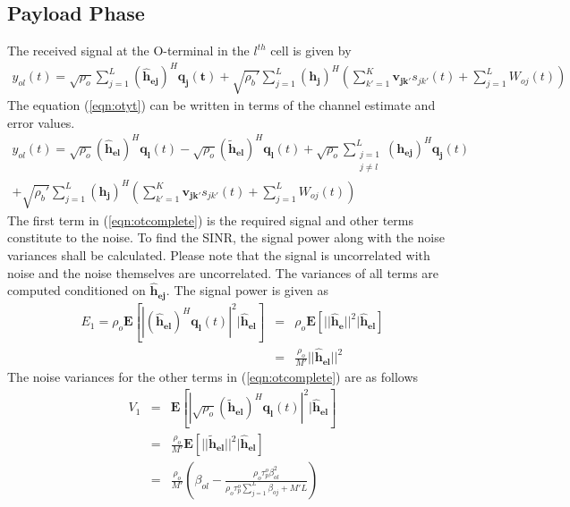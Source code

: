\documentclass[10pt, a4paper, twoside,fleqn]{article}
\begin{document}
\subsection{Payload Phase}

The received signal at the O-terminal in the $l^{th}$ cell is given by
\begin{eqnarray}\label{eqn:otyt}
 y_{ol}(t) = \sqrt{\rho_o} \sum_{j=1}^{L} (\mathbf{\hat h_{ej}})^H \mathbf{q_j(t)}
            + \sqrt{\rho_b'} \sum_{j=1}^{L} (\mathbf{h_j})^H \left(\sum_{k'=1}^{K} \mathbf{v_{jk'}} s_{jk'}(t) + \sum_{j=1}^{L}W_{oj}(t)  \right)
\end{eqnarray} 
The equation (\ref{eqn:otyt}) can be written in terms of the channel estimate and error values.
\begin{eqnarray}\label{eqn:otcomplete}
  y_{ol}(t)= \sqrt{\rho_o} (\mathbf{\hat h_{el}})^H \mathbf{q_l}(t) 
	    - \sqrt{\rho_o}(\mathbf{\widetilde{h}_{el}})^H\mathbf{q_l}(t)
	    +\sqrt{\rho_o} \sum_{\substack{j=1 \\ j \neq l}}^{L} (\mathbf{h_{ej}})^H\mathbf{q_{j}}(t) \nonumber \\
            + \sqrt{\rho_b'} \sum_{j=1}^{L} (\mathbf{h_j})^H \left(\sum_{k'=1}^{K} \mathbf{v_{jk'}} s_{jk'}(t) 
	    + \sum_{j=1}^{L}W_{oj}(t)  \right)            
\end{eqnarray}
The first term in (\ref{eqn:otcomplete}) is the required signal and other terms constitute to the noise. To find the SINR, the signal power along with the noise variances shall be calculated. Please note that the signal is uncorrelated with noise and the noise themselves are uncorrelated.
The variances of all terms are computed conditioned on $\mathbf{\hat h_{ej}}$. The signal power is given as
\begin{eqnarray}
	E_1 = \rho_o\mathbf{E}[|(\mathbf{\hat h_{el}})^H \mathbf{q_l}(t)|^2 | \mathbf{\hat h_{el}}] &=& \rho_o\mathbf{E}[||\mathbf{\hat h_e}||^2 | \mathbf{\hat h_{el}}] \nonumber \\
                                                                                           &=& \frac{\rho_o}{M'} ||\mathbf{\hat h_{el}}||^2
\end{eqnarray}
The noise variances for the other terms in (\ref{eqn:otcomplete}) are as follows
\begin{eqnarray}\label{eqn:otv1}
	V_1 &=& \mathbf{E}[|\sqrt{\rho_o}(\mathbf{\widetilde{h}_{el}})^H \mathbf{q_l}(t)|^2|\mathbf{\hat h_{el}}] \nonumber \\
            &=& \frac{\rho_o}{M'} \mathbf{E}[||\mathbf{\widetilde{h}_{el}}||^2 |\mathbf{\hat h_{el}}] \nonumber \\
            &=& \frac{\rho_o}{M'}\left(\beta_{ol}-\frac{\rho_o\tau_p^o\beta^2_{ol}}{\rho_o\tau_p^o\sum_{j=1}^{L}\beta_{oj}+M'L}\right)          
\end{eqnarray}
\end{document}
